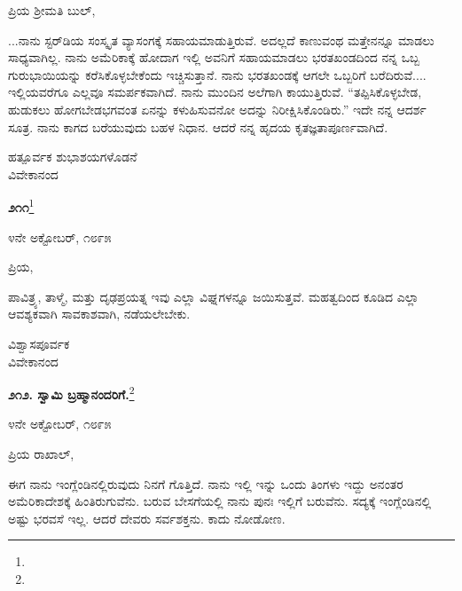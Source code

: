 \noindent
ಪ್ರಿಯ ಶ‍್ರೀಮತಿ ಬುಲ್,

...ನಾನು ಸ್ಟರ್‌ಡಿಯ ಸಂಸ್ಕೃತ ವ್ಯಾಸಂಗಕ್ಕೆ ಸಹಾಯಮಾಡುತ್ತಿರುವೆ. ಅದಲ್ಲದೆ ಕಾಣುವಂಥ ಮತ್ತೇನನ್ನೂ ಮಾಡಲು ಸಾಧ್ಯವಾಗಿಲ್ಲ. ನಾನು ಅಮೆರಿಕಾಕ್ಕೆ ಹೋದಾಗ ಇಲ್ಲಿ ಅವನಿಗೆ ಸಹಾಯಮಾಡಲು ಭರತಖಂಡದಿಂದ ನನ್ನ ಒಬ್ಬ ಗುರುಭಾಯಿಯನ್ನು ಕರೆಸಿಕೊಳ್ಳಬೇಕೆಂದು ಇಚ್ಚಿಸುತ್ತಾನೆ. ನಾನು ಭರತಖಂಡಕ್ಕೆ ಆಗಲೇ ಒಬ್ಬರಿಗೆ ಬರೆದಿರುವೆ.... ಇಲ್ಲಿಯವರೆಗೂ ಎಲ್ಲವೂ ಸಮರ್ಪಕವಾಗಿದೆ. ನಾನು ಮುಂದಿನ ಅಲೆಗಾಗಿ ಕಾಯುತ್ತಿರುವೆ. ``ತಪ್ಪಿಸಿಕೊಳ್ಳಬೇಡ, ಹುಡುಕಲು ಹೋಗಬೇಡ\enginline{-}ಭಗವಂತ ಏನನ್ನು ಕಳುಹಿಸುವನೋ ಅದನ್ನು ನಿರೀಕ್ಷಿಸಿಕೊಂಡಿರು.” ಇದೇ ನನ್ನ ಆದರ್ಶ ಸೂತ್ರ. ನಾನು ಕಾಗದ ಬರೆಯುವುದು ಬಹಳ ನಿಧಾನ. ಆದರೆ ನನ್ನ ಹೃದಯ ಕೃತಜ್ಞತಾಪೂರ್ಣವಾಗಿದೆ.

\vspace{-0.3cm}

{\flushright
ಹತ್ಪೂರ್ವಕ ಶುಭಾಶಯಗಳೊಡನೆ\\ವಿವೇಕಾನಂದ\par}

\begin{center}
\textbf{೨೧೧}\footnote{}
\end{center}

\vspace{-0.7cm}

\begin{flushright}
೪ನೇ ಅಕ್ಟೋಬರ್, ೧೮೯೫
\end{flushright}

\vspace{-0.4cm}

\noindent
ಪ್ರಿಯ,

ಪಾವಿತ್ರ್ಯ, ತಾಳ್ಮೆ, ಮತ್ತು ದೃಢಪ್ರಯತ್ನ\enginline{-} ಇವು ಎಲ್ಲಾ ವಿಘ್ನಗಳನ್ನೂ ಜಯಿಸುತ್ತವೆ. ಮಹತ್ವದಿಂದ ಕೂಡಿದ ಎಲ್ಲಾ ಆವಶ್ಯಕವಾಗಿ ಸಾವಕಾಶವಾಗಿ, ನಡೆಯಲೇಬೇಕು.

\vspace{-0.3cm}

{\flushright
ವಿಶ್ವಾಸಪೂರ್ವಕ\\ವಿವೇಕಾನಂದ\par}

\eject

\begin{center}
\textbf{೨೧೨. ಸ್ವಾಮಿ ಬ್ರಹ್ಮಾನಂದರಿಗೆ.}\footnote{}
\end{center}

\vspace{-0.5cm}

\begin{flushright}
೪ನೇ ಅಕ್ಟೋಬರ್, ೧೮೯೫
\end{flushright}

\noindent
ಪ್ರಿಯ ರಾಖಾಲ್,

ಈಗ ನಾನು ಇಂಗ್ಲೆಂಡಿನಲ್ಲಿರುವುದು ನಿನಗೆ ಗೊತ್ತಿದೆ. ನಾನು ಇಲ್ಲಿ ಇನ್ನು ಒಂದು ತಿಂಗಳು ಇದ್ದು ಅನಂತರ ಅಮೆರಿಕಾದೇಶಕ್ಕೆ ಹಿಂತಿರುಗುವೆನು. ಬರುವ ಬೇಸಗೆಯಲ್ಲಿ ನಾನು ಪುನಃ ಇಲ್ಲಿಗೆ ಬರುವೆನು. ಸದ್ಯಕ್ಕೆ ಇಂಗ್ಲೆಂಡಿನಲ್ಲಿ ಅಷ್ಟು ಭರವಸೆ ಇಲ್ಲ. ಆದರೆ ದೇವರು ಸರ್ವಶಕ್ತನು. ಕಾದು ನೋಡೋಣ.

